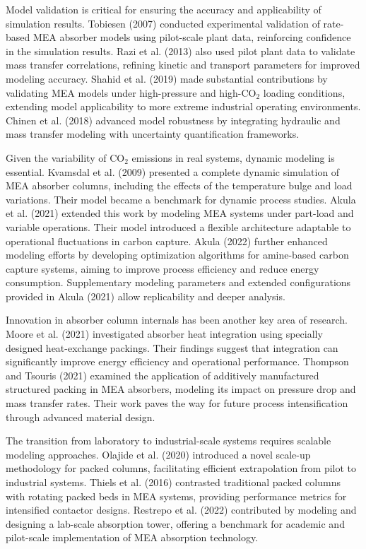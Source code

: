 \documentclass[a4paper,fleqn]{cas-sc}
\begin{document}
    Model validation is critical for ensuring the accuracy and applicability of simulation results. Tobiesen (2007) \cite{Tobiesen2007} conducted experimental validation of rate-based MEA absorber models using pilot-scale plant data, reinforcing confidence in the simulation results. Razi et al. (2013) \cite{Razi2013ValidationData} also used pilot plant data to validate mass transfer correlations, refining kinetic and transport parameters for improved modeling accuracy. Shahid et al. (2019) \cite{Shahid2019} made substantial contributions by validating MEA models under high-pressure and high-CO$_2$ loading conditions, extending model applicability to more extreme industrial operating environments. Chinen et al. (2018) \cite{Chinen2018} advanced model robustness by integrating hydraulic and mass transfer modeling with uncertainty quantification frameworks.

    Given the variability of CO$_2$ emissions in real systems, dynamic modeling is essential. Kvamsdal et al. (2009) \cite{Kvamsdal2009DynamicCapture} presented a complete dynamic simulation of MEA absorber columns, including the effects of the temperature bulge and load variations. Their model became a benchmark for dynamic process studies. Akula et al. (2021) \cite{Akula2021a} extended this work by modeling MEA systems under part-load and variable operations. Their model introduced a flexible architecture adaptable to operational fluctuations in carbon capture. Akula (2022) \cite{Akula2022} further enhanced modeling efforts by developing optimization algorithms for amine-based carbon capture systems, aiming to improve process efficiency and reduce energy consumption. Supplementary modeling parameters and extended configurations provided in Akula (2021) \cite{Akula2021} allow replicability and deeper analysis.

    Innovation in absorber column internals has been another key area of research. Moore et al. (2021) \cite{Moore2021AdvancedPackings} investigated absorber heat integration using specially designed heat-exchange packings. Their findings suggest that integration can significantly improve energy efficiency and operational performance. Thompson and Tsouris (2021) \cite{Thompson2021Rate-BasedPacking} examined the application of additively manufactured structured packing in MEA absorbers, modeling its impact on pressure drop and mass transfer rates. Their work paves the way for future process intensification through advanced material design.

    The transition from laboratory to industrial-scale systems requires scalable modeling approaches. Olajide et al. (2020) \cite{Olajide2020} introduced a novel scale-up methodology for packed columns, facilitating efficient extrapolation from pilot to industrial systems. Thiels et al. (2016) \cite{Thiels2016ModellingColumn} contrasted traditional packed columns with rotating packed beds in MEA systems, providing performance metrics for intensified contactor designs. Restrepo et al. (2022) \cite{Restrepo2022DesignPlant} contributed by modeling and designing a lab-scale absorption tower, offering a benchmark for academic and pilot-scale implementation of MEA absorption technology.
\end{document}
